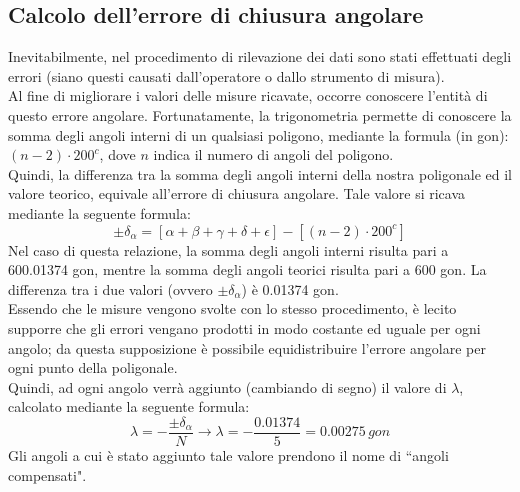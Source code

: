 \subsection{Calcolo dell'errore di chiusura angolare}
Inevitabilmente, nel procedimento di rilevazione dei dati sono stati effettuati degli errori (siano questi causati dall'operatore o dallo strumento di misura).\\
Al fine di migliorare i valori delle misure ricavate, occorre conoscere l'entità di questo errore angolare. Fortunatamente, la trigonometria permette di conoscere la somma degli angoli interni di un qualsiasi poligono, mediante la formula (in gon): $(n - 2) \cdot 200^c$, dove $n$ indica il numero di angoli del poligono.\\
Quindi, la differenza tra la somma degli angoli interni della nostra poligonale ed il valore teorico, equivale all'errore di chiusura angolare. Tale valore si ricava mediante la seguente formula:
\begin{equation} \label{errore_chiusura_angolare}
    \pm \delta_\alpha = \left[ \alpha + \beta + \gamma + \delta + \epsilon \right] - \left[ (n - 2) \cdot 200^c\right]
\end{equation}
Nel caso di questa relazione, la somma degli angoli interni risulta pari a 600.01374 gon, mentre la somma degli angoli teorici risulta pari a 600 gon. La differenza tra i due valori (ovvero $\pm \delta_\alpha$) \label{delta_alpha} è 0.01374 gon.\\
Essendo che le misure vengono svolte con lo stesso procedimento, è lecito supporre che gli errori vengano prodotti in modo costante ed uguale per ogni angolo; da questa supposizione è possibile equidistribuire l'errore angolare per ogni punto della poligonale.\\
Quindi, ad ogni angolo verrà aggiunto (cambiando di segno) il valore di $\lambda$, calcolato mediante la seguente formula:
\begin{equation} 
    \lambda = - \frac{\pm \delta_\alpha}{N} \xrightarrow{} \lambda = - \frac{0.01374}{5} = 0.00275 \,gon
\end{equation} 
Gli angoli a cui è stato aggiunto tale valore prendono il nome di ``angoli compensati".


